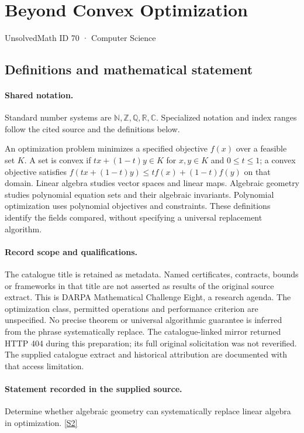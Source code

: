 \documentclass[11pt]{article}
\newcommand{\sref}[2]{\hyperlink{source:#1:#2}{[S#2]}}
\begin{document}
\setcounter{section}{69}
\section{Beyond Convex Optimization}\label{70}
{\small\sffamily UnsolvedMath ID 70 · Computer Science}
\subsection{Definitions and mathematical statement}

\paragraph{Shared notation.}Standard number systems are $\mathbb N,\mathbb Z,\mathbb Q,\mathbb R,\mathbb C$. Specialized notation and index ranges follow the cited source and the definitions below.


An optimization problem minimizes a specified objective $f(x)$ over a feasible set $K$. A set is convex if $tx+(1-t)y\in K$ for $x,y\in K$ and $0\leq t\leq1$; a convex objective satisfies $f(tx+(1-t)y)\leq tf(x)+(1-t)f(y)$ on that domain. Linear algebra studies vector spaces and linear maps. Algebraic geometry studies polynomial equation sets and their algebraic invariants. Polynomial optimization uses polynomial objectives and constraints. These definitions identify the fields compared, without specifying a universal replacement algorithm.
\paragraph{Record scope and qualifications.}
The catalogue title is retained as metadata. Named certificates, contracts, bounds or frameworks in that title are not asserted as results of the original source extract.
This is DARPA Mathematical Challenge Eight, a research agenda. The optimization class, permitted operations and performance criterion are unspecified. No precise theorem or universal algorithmic guarantee is inferred from the phrase systematically replace. The catalogue-linked mirror returned HTTP 404 during this preparation; its full original solicitation was not reverified. The supplied catalogue extract and historical attribution are documented with that access limitation.
\paragraph{Statement recorded in the supplied source.}
Determine whether algebraic geometry can systematically replace linear algebra in optimization. \sref{70}{2}
\end{document}
